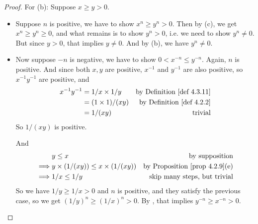 \begin{proof}
For (b): Suppose \(x \ge y > 0\).
\begin{itemize}
    \item 
        Suppose \(n\) is positive, we have to show \(x^n \ge y^n > 0\).
        Then by (c), we get \(x^n \ge y^n \ge 0\), and what remains is to show \(y^n > 0\), i.e. we need to show \(y^n \neq 0\).
        But since \(y > 0\), that implies \(y \neq 0\).
        And by (b), we have \(y^n \neq 0\).
    \item
        Now suppose \(-n\) is negative, we have to show \(0 < x^{-n} \le y^{-n}\).
        Again, \(n\) is positive.
        And since both \(x, y\) are positive, \(x^{-1}\) and \(y^{-1}\) are also positive, so \(x^{-1} y^{-1}\) are positive, and
        \begin{align*}
            x^{-1} y^{-1} & = 1/x \X 1/y & \text{by \DEF{4.3.11}} \\
                          & = (1 \X 1)/(xy) & \text{by \DEF{4.2.2}} \\
                          & = 1/(xy) & \text{trivial}
        \end{align*}
        So \(1/(xy)\) is positive.
        
        And
        \begin{align*}
                     & y \le x & \text{by supposition} \\
            \implies & y \X (1/(xy)) \le x \X (1/(xy)) & \text{by \PROP{4.2.9}(e)} \\
            \implies & 1/x \le 1/y & \text{skip many steps, but trivial}
        \end{align*}
        So we have \(1/y \ge 1/x > 0\) and \(n\) is positive, and they satisfy the previous case, so we get \((1/y)^n \ge (1/x)^n > 0\).
        By , that implies \(y^{-n} \ge x^{-n} > 0\).
    

\end{itemize}


\end{proof}
